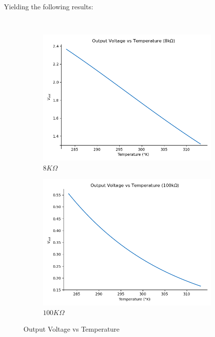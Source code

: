 \documentclass[12pt]{article}
\begin{document}
    Yielding the following results:
    
    ~

    \begin{figure}[h]
        \centering
        \begin{subfigure}{0.45\textwidth}
            \centering
            \includegraphics[width=\textwidth]{images/VoutPorTemp.png}
            \caption{ $8K\Omega$ }
        \end{subfigure}\hfill
        \begin{subfigure}{0.45\textwidth}
            \centering
            \includegraphics[width=\textwidth]{images/VoutPorTemp100k.png}
            \caption{$100K\Omega$}
        \end{subfigure}
        \caption{Output Voltage vs Temperature}
    \end{figure}
\end{document}

